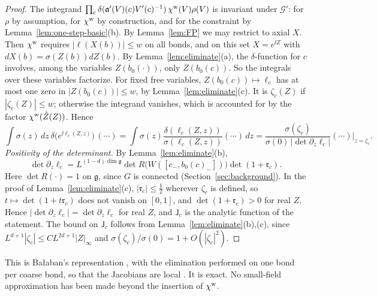 \begin{proof}
The integrand $\prod_c\delta(\mathfrak a'(V)(c)V'(c)^{-1})\,\chi^{\rm w}(V)\rho(V)$ is invariant under $\mathcal G'$: for $\rho$ by assumption, for $\chi^{\rm w}$ by construction, and for the constraint by Lemma~\ref{lem:one-step-basic}(b). By Lemma~\ref{lem:FP} we may restrict to axial $X$. Then $\chi^{\rm w}$ requires $|\ell(X(b))|\le w$ on all bonds, and on this set $X=e^{\ii Z}$ with $dX(b)=\sigma(Z(b))dZ(b)$. By Lemma~\ref{lem:eliminate}(a), the $\delta$-function for $c$ involves, among the variables $Z(b_0(\cdot))$, only $Z(b_0(c))$. So the integrals over these variables factorize. For fixed free variables, $Z(b_0(c))\mapsto\ell_c$ has at most one zero in $|Z(b_0(c))|\le w$, by Lemma~\ref{lem:eliminate}(c). It is $\zeta_c(Z)$ if $|\zeta_c(Z)|\le w$; otherwise the integrand vanishes, which is accounted for by the factor $\chi^{\rm w}(\hat Z(Z))$. Hence
\[
\int\sigma(z)\,dz\ \delta\big(e^{\ii\ell_c(Z,z)}\big)\,(\cdots)=\int\sigma(z)\frac{\delta(\ell_c(Z,z))}{\sigma(\ell_c(Z,z))}(\cdots)\,dz=\frac{\sigma(\zeta_c)}{\sigma(0)\,|\det\partial_z\ell_c|}(\cdots)\Big|_{z=\zeta_c} .
\]
\emph{Positivity of the determinant.} By Lemma~\ref{lem:eliminate}(b),
\[
\det\partial_z\ell_c=L^{(1-d)\dim\mathfrak g}\det R\big(W([c_-,b_0(c)_-])\big)\det(1+\mathfrak r_c).
\]
Here $\det R(\cdot)=1$ on $\mathfrak g$, since $G$ is connected (Section~\ref{sec:background}). In the proof of Lemma~\ref{lem:eliminate}(c), $|\mathfrak r_c|\le\frac12$ wherever $\zeta_c$ is defined, so $t\mapsto\det(1+t\mathfrak r_c)$ does not vanish on $[0,1]$, and $\det(1+\mathfrak r_c)>0$ for real $Z$. Hence $|\det\partial_z\ell_c|=\det\partial_z\ell_c$ for real $Z$, and $\mathsf J_c$ is the analytic function of the statement. The bound on $\mathsf J_c$ follows from Lemma~\ref{lem:eliminate}(b),(c), since $L^{d+1}|\zeta_c|\le CL^{2d+1}|Z|_\infty$ and $\sigma(\zeta_c)/\sigma(0)=1+O(|\zeta_c|^2)$.
\end{proof}

This is Ba\l aban's representation \cite[(9)--(18)]{BalUV3}, with the elimination performed on one bond per coarse bond, so that the Jacobians are local \cite[(17), (20)]{BalUV3}. It is exact. No small-field approximation has been made beyond the insertion of $\chi^{\rm w}$.
